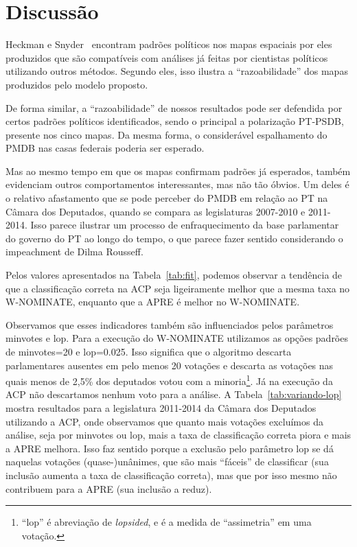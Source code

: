 \documentclass[
	article,			%
	12pt,				%
	oneside,			%
	a4paper,			%
	english,			%
	brazil,				%
	sumario=tradicional,
	oldfontcommands %
	]{abntex2}
\newcommand\wnominate{W-NOMINATE\xspace}
\begin{document}
\section{Discussão}
\label{sec:discussao}

Heckman e Snyder~\cite{heckman-snyder1997} encontram padrões políticos nos mapas espaciais por eles produzidos que são compatíveis com análises já feitas por cientistas políticos utilizando outros métodos. Segundo eles, isso ilustra a ``razoabilidade'' dos mapas produzidos pelo modelo proposto. 

De forma similar, a ``razoabilidade'' de nossos resultados pode ser defendida por certos padrões políticos identificados, sendo o principal a polarização PT-PSDB, presente nos cinco mapas. Da mesma forma, o considerável espalhamento do PMDB nas casas federais poderia ser esperado.

Mas ao mesmo tempo em que os mapas confirmam padrões já esperados, também evidenciam outros comportamentos interessantes, mas não tão óbvios. Um deles é o relativo afastamento que se pode perceber do PMDB em relação ao PT na Câmara dos Deputados, quando se compara as legislaturas 2007-2010 e 2011-2014. Isso parece ilustrar um processo de enfraquecimento da base parlamentar do governo do PT ao longo do tempo, o que parece fazer sentido considerando o impeachment de Dilma Rousseff.

Pelos valores apresentados na Tabela~\ref{tab:fit}, podemos observar a tendência de que a classificação correta na ACP seja ligeiramente melhor que a mesma taxa no \wnominate, enquanto que a APRE é melhor no \wnominate.

Observamos que esses indicadores também são influenciados pelos parâmetros \textsf{minvotes} e \textsf{lop}. Para a execução do \wnominate utilizamos as opções padrões de \textsf{minvotes=20} e \textsf{lop=0.025}. Isso significa que o algoritmo descarta parlamentares ausentes em pelo menos 20 votações e descarta as votações nas quais menos de 2,5\% dos deputados votou com a minoria\footnote{``lop'' é abreviação de \emph{lopsided}, e é a medida de ``assimetria'' em uma votação.}. Já na execução da ACP não descartamos nenhum voto para a análise. A Tabela~\ref{tab:variando-lop} mostra resultados para a legislatura 2011-2014 da Câmara dos Deputados utilizando a ACP, onde observamos que quanto mais votações excluímos da análise, seja por \textsf{minvotes} ou \textsf{lop}, mais a taxa de classificação correta piora e mais a APRE melhora. Isso faz sentido porque a exclusão pelo parâmetro \textsf{lop} se dá naquelas votações (quase-)unânimes, que são mais ``fáceis'' de classificar (sua inclusão aumenta a taxa de classificação correta), mas que por isso mesmo não contribuem para a APRE (sua inclusão a reduz). 
\end{document}
